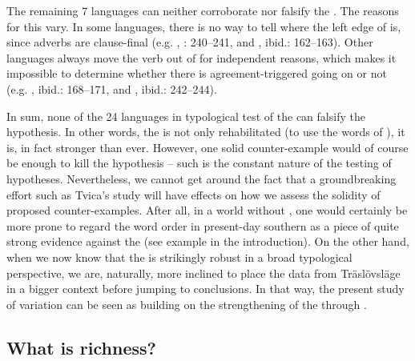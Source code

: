 \documentclass[output=paper,colorlinks,citecolor=brown,draft,draftmode]{langscibook}
\begin{document}
The remaining 7 languages can neither corroborate nor falsify the . The reasons for this vary. In some languages, there is no way to tell where the left edge of  is, since adverbs are clause-final (e.g. , \citealt{Tvica2017}: 240–241, and , ibid.: 162–163). Other languages always move the verb out of  for independent reasons, which makes it impossible to determine whether there is agreement-triggered  going on or not (e.g. , ibid.: 168–171, and , ibid.: 242–244).



In sum, none of the 24 languages in  typological test of the  can falsify the hypothesis. In other words, the  is not only rehabilitated (to use the words of \citealt{KoenemanZeijlstra2014}), it is, in fact stronger than ever. However, one solid counter-example would of course be enough to kill the hypothesis – such is the constant nature of the testing of hypotheses. Nevertheless, we cannot get around the fact that a groundbreaking effort such as Tvica’s study will have effects on how we assess the solidity of proposed counter-examples. After all, in a world without \citet{Tvica2017}, one would certainly be more prone to regard the  word order in present-day southern  as a piece of quite strong evidence against the  (see example  in the introduction). On the other hand, when we now know that the  is strikingly robust in a broad typological perspective, we are, naturally, more inclined to place the data from Träslövsläge in a bigger context before jumping to conclusions. In that way, the present study of  variation can be seen as building on the strengthening of the  through \citet{Tvica2017}.


\subsection{What is richness?}\label{sec:petzell:4.2}
\end{document}
